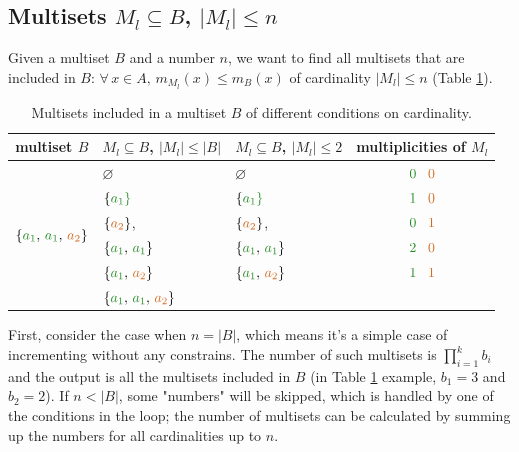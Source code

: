 \documentclass[12pt]{article}
\begin{document}
\subsection{Multisets $M_l \subseteq B$, $|M_l| \leqslant n$}

Given a multiset $B$ and a number $n$, we want to find all multisets that are included in $B$: $\forall \, x \in A, \, m_{M_l}(x) \leqslant m_B(x)$ of cardinality $|M_l| \leqslant n$ (Table \ref{tab:ex2}). \\

\begin{table}
  \centering
  \begin{tabular}{| c | l | l | c |}
    \hline
    \rowcolor{bg} 
      multiset $B$ & $M_l \subseteq B$, $|M_l| \leqslant |B|$ & 
                     $M_l \subseteq B$, $|M_l| \leqslant 2$   & 
                     multiplicities of $M_l$                                  \\
    \hline
    \multirow{6}{*}{$\{{\color{c1} a_1}, \, {\color{c1} a_1}, \, 
                       {\color{c2} a_2}\}$} 
    & $\varnothing$ & $\varnothing$ & ${\color{c1}0} \;\;\; {\color{c2}0}$    \\         & $\{\color{c1}a_1\}$ & $\{\color{c1}a_1\}$ 
    & ${\color{c1}1} \;\;\; {\color{c2}0}$                                    \\ 
    & $\{{\color{c2}a_2}\}$, & $\{{\color{c2}a_2}\}$, 
    & ${\color{c1}0} \;\;\; {\color{c2}1}$                                    \\ 
    & $\{{\color{c1}a_1}, \, {\color{c1}a_1}\}$  
    & $\{{\color{c1}a_1}, \, {\color{c1}a_1}\}$  
    & ${\color{c1}2} \;\;\; {\color{c2}0}$                                    \\           & $\{{\color{c1}a_1}, \, {\color{c2}a_2}\}$  
    & $\{{\color{c1}a_1}, \, {\color{c2}a_2}\}$ 
    & ${\color{c1} 1} \;\;\; {\color{c2} 1}$                                  \\  
    \cline{3-4}          
    & $\{{\color{c1}a_1}, \, {\color{c1}a_1}, \, {\color{c2}a_2}\}$ 
    & \cellcolor{Gainsboro} 
    & \cellcolor{Gainsboro}{${\color{c1}2} \;\;\; {\color{c2}1}$}             \\
    \hline    
  \end{tabular}
  \caption{Multisets included in a multiset $B$ of different conditions on cardinality.}
  \label{tab:ex2}
\end{table}  

First, consider the case when $n = |B|$, which means it's a simple case of incrementing without any constrains. The number of such multisets is $\prod_{i = 1}^k b_i$ and the output is all the multisets included in $B$ (in Table \ref{tab:ex2} example, $b_1 = 3$ and $b_2 = 2$). If $n < |B|$, some "numbers" will be skipped, which is handled by one of the conditions in the loop; the number of multisets can be calculated by summing up the numbers for all cardinalities up to $n$. 
      
\end{document}
